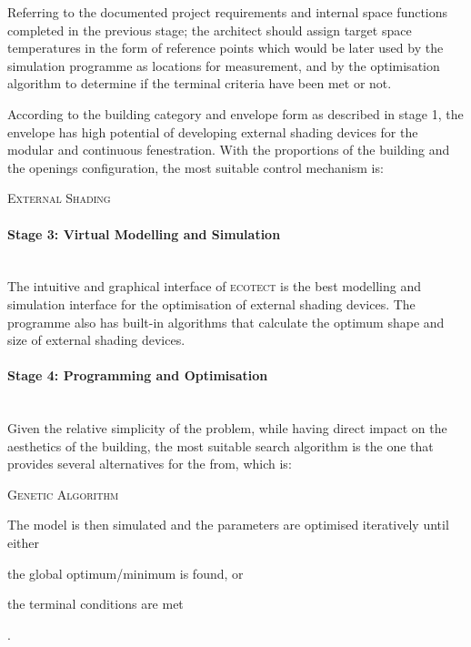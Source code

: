 Referring to the documented project requirements and internal space functions completed in the previous stage; the architect should assign target space temperatures in the form of reference points which would be later used by the simulation programme as locations for measurement, and by the optimisation algorithm to determine if the terminal criteria have been met or not.

According to the building category and envelope form as described in stage 1, the envelope has high potential of developing external shading devices for the modular and continuous fenestration. With the proportions of the building and the openings configuration, the most suitable control mechanism is:

\begin{compactenum}
	\item \textsc{External Shading}
\end{compactenum}

\paragraph{Stage 3: Virtual Modelling and Simulation}\mbox{}\\

The intuitive and graphical interface of \textsc{ecotect} is the best modelling and simulation interface for the optimisation of external shading devices. The programme also has built-in algorithms that calculate the optimum shape and size of external shading devices.

\paragraph{Stage 4: Programming and Optimisation}\mbox{}\\

Given the relative simplicity of the problem, while having direct impact on the aesthetics of the building, the most suitable search algorithm is the one that provides several alternatives for the from, which is:

\begin{compactenum}
\item \textsc{Genetic Algorithm}
\end{compactenum}

The model is then simulated and the parameters are optimised iteratively until either \begin{inparaenum}[a)]\item the global optimum/minimum is found, or \item the terminal conditions are met\end{inparaenum}.


